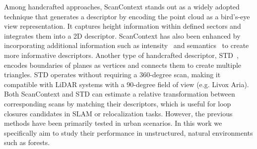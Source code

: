 Among handcrafted approaches, ScanContext\cite{kim2018iros,kim2021tro} stands out as a widely adopted technique that generates a descriptor by encoding the point cloud as a bird’s-eye view representation. It captures height information within defined sectors and integrates them into a 2D descriptor. 
ScanContext has also been enhanced by incorporating additional information such as intensity~\cite{wang2020icra} and semantics~\cite{li2021iros} to create more informative descriptors. 
Another type of handcrafted descriptor, STD~\cite{yuan2023icra}, encodes boundaries of planes as vertices and connects them to create multiple triangles. STD operates without requiring a 360-degree scan, making it compatible with LiDAR systems with a 90-degree field of view (e.g. Livox Aria). Both ScanContext and STD can estimate a relative transformation between corresponding scans by matching their descriptors, which is useful for loop closures candidates in SLAM or relocalization tasks. However, the previous methods have been primarily tested in urban scenarios. In this work we specifically aim to study their performance in unstructured, natural environments such as forests.

